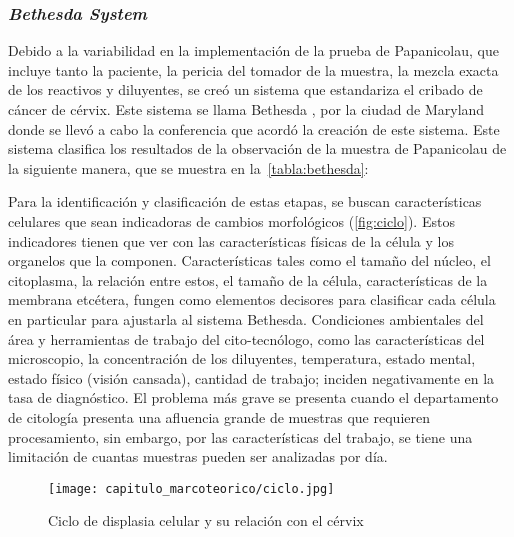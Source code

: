 \subsubsection{\emph{Bethesda System}}

Debido a la variabilidad en la implementación de la prueba de Papanicolau, que
incluye tanto la paciente, la pericia del tomador de la muestra, la mezcla
exacta de los reactivos y diluyentes, se creó un sistema que estandariza el
cribado de cáncer de cérvix. Este sistema se llama Bethesda , por la ciudad de Maryland donde se llevó a cabo la conferencia
que acordó la creación de este sistema. Este sistema clasifica los resultados de
la observación de la muestra de Papanicolau de la siguiente manera, que se
muestra en la~\autoref{tabla:bethesda}:

\begin{table}[H]
    \centering
    \caption{Niveles del sistema Bethesda de reporte cervical y citológico}\label{tabla:bethesda}
    \end{table}

Para la identificación y clasificación de estas etapas, se buscan
características celulares que sean indicadoras de cambios morfológicos
(\autoref{fig:ciclo}). Estos indicadores tienen que ver con las características
físicas de la célula y los organelos que la componen. Características tales como
el tamaño del núcleo, el citoplasma, la relación entre estos, el tamaño de la
célula, características de la membrana etcétera, fungen como elementos decisores
para clasificar cada célula en particular para ajustarla al sistema Bethesda.
Condiciones ambientales del área y herramientas de trabajo del cito-tecnólogo,
como las características del microscopio, la concentración de los diluyentes,
temperatura, estado mental, estado físico (visión cansada), cantidad de trabajo;
inciden negativamente en la tasa de diagnóstico. El problema más grave se
presenta cuando el departamento de citología presenta una afluencia grande de
muestras que requieren procesamiento, sin embargo, por las características del
trabajo, se tiene una limitación de cuantas muestras pueden ser analizadas por
día.~\cite{Kurman1995}

\begin{figure}[H]
    \centering
    \texttt{[image: capitulo\_marcoteorico/ciclo.jpg]}
    \caption{Ciclo de displasia celular y su relación con el cérvix}\label{fig:ciclo}
\end{figure}